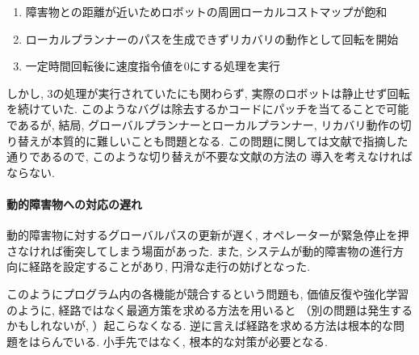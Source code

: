 \begin{enumerate}
  \item 障害物との距離が近いためロボットの周囲ローカルコストマップが飽和
  \item ローカルプランナーのパスを生成できずリカバリの動作として回転を開始
  \item  一定時間回転後に速度指令値を0にする処理を実行
\end{enumerate}
しかし, 3の処理が実行されていたにも関わらず, 
実際のロボットは静止せず回転を続けていた. 
このようなバグは除去するかコードにパッチを当てることで可能であるが, 
結局, グローバルプランナーとローカルプランナー, 
リカバリ動作の切り替えが本質的に難しいことも問題となる. 
この問題に関しては文献\cite{ueda2023JRM}で指摘した通りであるので, 
このような切り替えが不要な文献\cite{ueda2023JRM}の方法の
導入を考えなければならない. 

\paragraph{動的障害物への対応の遅れ}
動的障害物に対するグローバルパスの更新が遅く, 
オペレーターが緊急停止を押さなければ衝突してしまう場面があった. 
また, システムが動的障害物の進行方向に経路を設定することがあり, 
円滑な走行の妨げとなった. 

このようにプログラム内の各機能が競合するという問題も, 
価値反復や強化学習のように, 
経路ではなく最適方策を求める方法を用いると
（別の問題は発生するかもしれないが, ）起こらなくなる. 
逆に言えば経路を求める方法は根本的な問題をはらんでいる. 
小手先ではなく, 根本的な対策が必要となる. 

